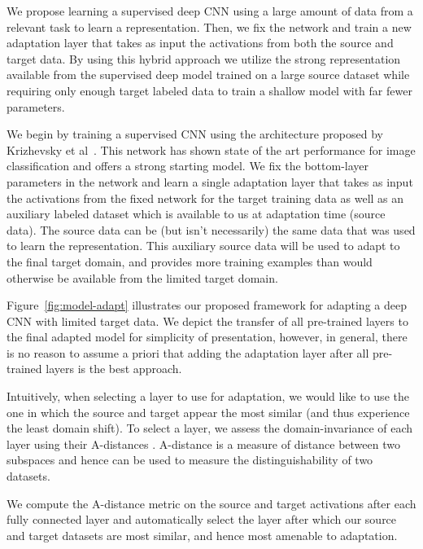 We propose learning a supervised deep CNN using a large amount of
data from a relevant task to learn a representation. Then, we fix the network and train a new adaptation layer
that takes as input the activations from both the source and target data. By
using this hybrid approach we utilize the strong representation available from
the supervised deep model trained on a large source dataset while requiring only
enough target labeled data to train a shallow model with far fewer parameters.

We begin by training a supervised CNN using the architecture proposed by 
Krizhevsky et al~\cite{supervision}. This network has shown state of the art
performance for image classification and offers a strong starting model.
We fix the bottom-layer parameters in the
network and learn a single adaptation layer that takes as input
the activations from the fixed network for the target training data as well as an auxiliary labeled
dataset which is available to us at adaptation time (source data). The source data
can be (but isn't necessarily) the same data that was used to learn the representation.
This auxiliary source data will be used to adapt to the final target domain, and
provides more training examples than would otherwise be available from the limited target domain.

Figure~\ref{fig:model-adapt} illustrates our proposed framework for adapting a deep CNN
with limited target data. We depict the transfer of all pre-trained layers to the final adapted model
for simplicity of presentation,  however, in general, there is no reason to assume a priori that
adding the adaptation layer after all pre-trained layers is the best approach.

Intuitively, when selecting a layer to use for adaptation, we would like to use
the one in which the source and target appear the most similar (and thus
experience the least domain shift).
To select a layer, we assess the domain-invariance of each layer using their A-distances
\cite{adist}. A-distance is a measure of distance between two subspaces and hence 
can be used to measure the distinguishability of two datasets.

We compute the A-distance metric on the source and target activations after each fully 
connected layer
and automatically select the  layer after which
our source and target datasets are most similar, and hence most amenable to adaptation.

